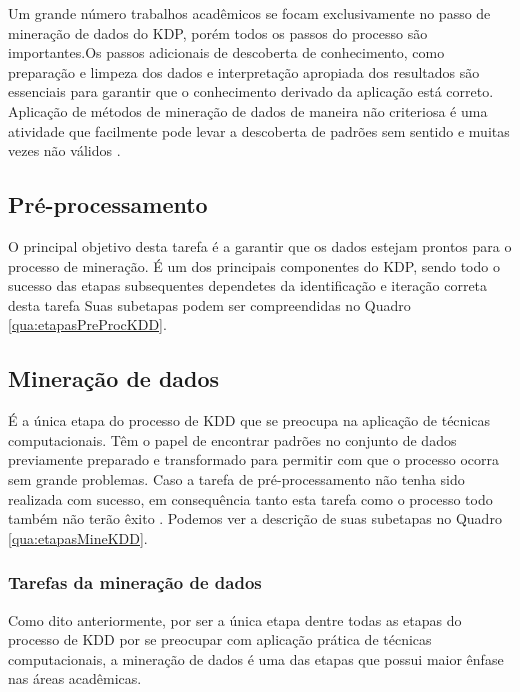 Um grande número trabalhos acadêmicos se focam exclusivamente no passo de mineração de dados do KDP, porém todos os passos do processo são importantes.Os passos adicionais de descoberta de conhecimento, como preparação e limpeza dos dados e interpretação apropiada dos resultados	são essenciais para garantir que o conhecimento derivado da aplicação está correto. Aplicação de métodos de mineração de dados de maneira não criteriosa é uma atividade que facilmente pode levar a descoberta de padrões sem sentido e muitas vezes não válidos .

\subsection{Pré-processamento}
\label{subsec:preprocKDD}

O principal objetivo desta tarefa é a garantir que os dados estejam prontos para o processo de mineração. É um dos principais componentes do KDP, sendo todo o sucesso das etapas subsequentes dependetes da identificação e iteração correta desta tarefa  Suas subetapas podem ser compreendidas no Quadro \ref{qua:etapasPreProcKDD}.



\subsection{Mineração de dados}
\label{subsec:mineKDD}

É a única etapa do processo de KDD que se preocupa na aplicação de técnicas computacionais. Têm o papel de encontrar padrões no conjunto de dados previamente preparado e transformado para permitir com que o processo ocorra sem grande problemas. Caso a tarefa de pré-processamento não tenha sido realizada com sucesso, em consequência tanto esta tarefa como o processo todo também não terão êxito . Podemos ver a descrição de suas subetapas no Quadro \ref{qua:etapasMineKDD}.



\subsubsection{Tarefas da mineração de dados}
\label{subsubsec:tarefasMineKDD}

Como dito anteriormente, por ser a única etapa dentre todas as etapas do processo de KDD por se preocupar com aplicação prática de técnicas computacionais, a mineração de dados é uma das etapas que possui maior ênfase nas áreas acadêmicas.

